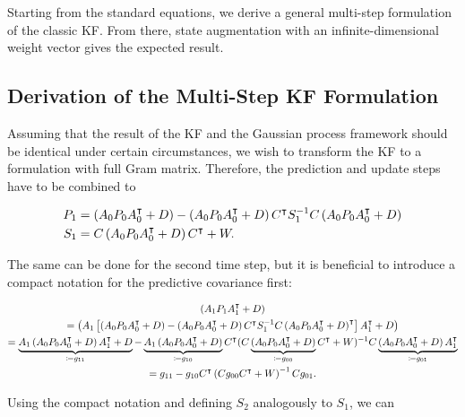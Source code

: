 Starting from the standard equations, we derive a general multi-step formulation
of the classic KF. From there, state augmentation with an infinite-dimensional
weight vector gives the expected result.

\subsection{Derivation of the Multi-Step KF Formulation}
Assuming that the result of the KF and the Gaussian process framework should be
identical under certain circumstances, we wish to transform the KF to a
formulation with full Gram matrix. Therefore, the prediction and update steps
have to be combined to
\begin{fullwidth}\vspace{-\baselineskip}
\begin{subequations}
\begin{align}\label{eq:single-step}
  P_1 &= \left(A_0 P_0 A_0\T + \DC\right) - \left(A_0 P_0 A_0\T + \DC\right)C\T
  S_1\inv C \left(A_0 P_0 A_0\T + \DC\right) \\
  S_1 &= C\left(A_0 P_0 A_0\T + \DC\right)C\T + \NC.
\end{align}
\end{subequations}
\end{fullwidth}
The same can be done for the second time step, but it is beneficial to introduce
a compact notation for the predictive covariance first:
\begin{fullwidth}\vspace{-\baselineskip}
\begin{multline}
\label{eq:compact-notation}
  \left(A_1  P_1  A_1\T + \DC\right)\\
  =
  \left(A_1  \left[
  \left(A_0 P_0 A_0\T + \DC\right) - \left(A_0 P_0 A_0\T + \DC\right)C\T
    S_1\inv  C \left(A_0 P_0 A_0\T + \DC\right)\T
  \right]  A_1\T + \DC\right)\\
  =
  \underbrace{A_1 \left(A_0 P_0 A_0\T + \DC\right) A_1\T + \DC}_{\ce g_{11}}
   -
   \underbrace{A_1 \left(A_0 P_0 A_0\T + \DC\right)}_{\ce g_{10}}C\T
  (C\underbrace{\left(A_0 P_0 A_0\T + \DC\right)}_{\ce g_{00}}C\T + \NC)\inv
  C \underbrace{\left(A_0 P_0 A_0\T + \DC\right) A_1\T}_{\ce g_{01}}
  \\
  =
  g_{11} - g_{10}C\T\left(C g_{00} C\T + \NC\right)\inv C g_{01}.
\end{multline}
\end{fullwidth}
Using the compact notation and defining $S_2$ analogously to $S_1$, we can
